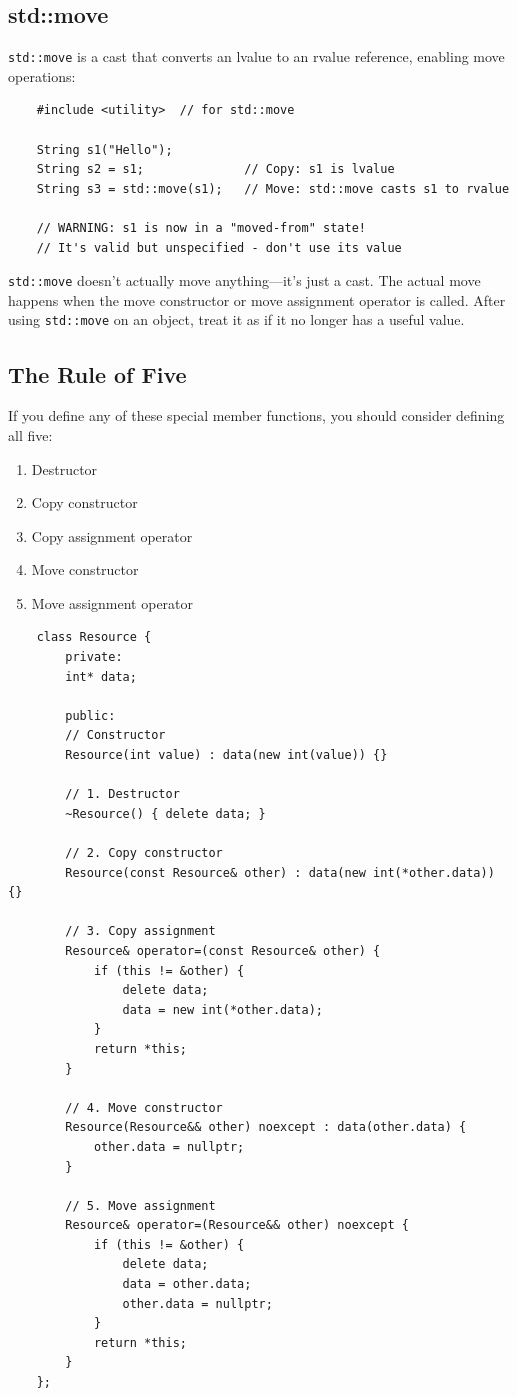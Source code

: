 \subsection{std::move}

\texttt{std::move} is a cast that converts an lvalue to an rvalue reference, enabling move operations:

\begin{lstlisting}
	#include <utility>  // for std::move
	
	String s1("Hello");
	String s2 = s1;              // Copy: s1 is lvalue
	String s3 = std::move(s1);   // Move: std::move casts s1 to rvalue
	
	// WARNING: s1 is now in a "moved-from" state!
	// It's valid but unspecified - don't use its value
\end{lstlisting}

\begin{remark}
	\texttt{std::move} doesn't actually move anything—it's just a cast. The actual move happens when the move constructor or move assignment operator is called. After using \texttt{std::move} on an object, treat it as if it no longer has a useful value.
\end{remark}

\subsection{The Rule of Five}

If you define any of these special member functions, you should consider defining all five:

\begin{enumerate}
	\item Destructor
	\item Copy constructor
	\item Copy assignment operator
	\item Move constructor
	\item Move assignment operator
\end{enumerate}

\begin{lstlisting}
	class Resource {
		private:
		int* data;
		
		public:
		// Constructor
		Resource(int value) : data(new int(value)) {}
		
		// 1. Destructor
		~Resource() { delete data; }
		
		// 2. Copy constructor
		Resource(const Resource& other) : data(new int(*other.data)) {}
		
		// 3. Copy assignment
		Resource& operator=(const Resource& other) {
			if (this != &other) {
				delete data;
				data = new int(*other.data);
			}
			return *this;
		}
		
		// 4. Move constructor
		Resource(Resource&& other) noexcept : data(other.data) {
			other.data = nullptr;
		}
		
		// 5. Move assignment
		Resource& operator=(Resource&& other) noexcept {
			if (this != &other) {
				delete data;
				data = other.data;
				other.data = nullptr;
			}
			return *this;
		}
	};
\end{lstlisting}

